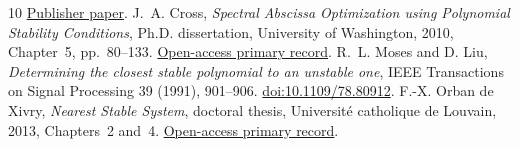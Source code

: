 \documentclass[11pt]{article}
\theoremstyle{remark}\newtheorem{remark}[theorem]{Remark}
\begin{document}
\begin{thebibliography}{10}
\href{https://www.heldermann-verlag.de/jca/jca17/jca0849_b.pdf}{Publisher paper}.
 J.~A. Cross, \emph{Spectral Abscissa Optimization using
Polynomial Stability Conditions}, Ph.D. dissertation, University of
Washington, 2010, Chapter~5, pp.~80--133.
\href{https://www.proquest.com/docview/288328008}{Open-access primary record}.
 R.~L. Moses and D. Liu, \emph{Determining the closest stable
polynomial to an unstable one}, IEEE Transactions on Signal Processing 39
(1991), 901--906.
\href{https://doi.org/10.1109/78.80912}{doi:10.1109/78.80912}.
 F.-X. Orban de Xivry, \emph{Nearest Stable System},
doctoral thesis, Universit\'e catholique de Louvain, 2013,
Chapters~2 and~4.
\href{https://research.dial.uclouvain.be/entities/publication/650a4c86-3c4c-439e-9a8f-54c4d42eab7f}{Open-access primary record}.
\end{thebibliography}
\end{document}

